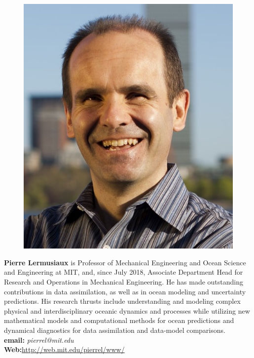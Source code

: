 \vspace*{3cm}
\parbox{6.5in}{
\begin{figure} %
  \vspace{-\intextsep}
    \hspace*{-.35\columnsep}\includegraphics[scale=0.3]{fig/Pierre.jpg}
\end{figure}
\textbf{Pierre Lermusiaux} is Professor of Mechanical Engineering and
Ocean Science and Engineering at MIT, and, since July 2018, Associate
Department Head for Research and Operations in Mechanical
Engineering. He has made outstanding contributions in data
assimilation, as well as in ocean modeling and uncertainty
predictions. His research thrusts include understanding and modeling
complex physical and interdisciplinary oceanic dynamics and processes
while utilizing new mathematical models and computational methods for
ocean predictions and dynamical diagnostics for data assimilation
and data-model comparisons.
\\
\textbf{email: }\emph{pierrel@mit.edu}\\
\textbf{Web:}\url{http://web.mit.edu/pierrel/www/} 
}

